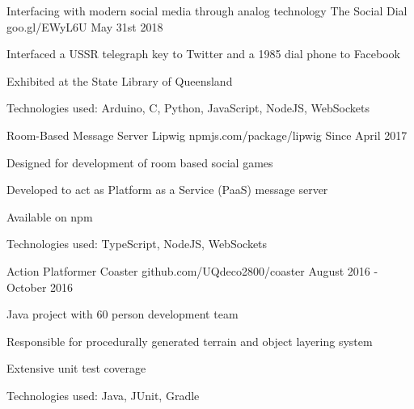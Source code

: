 


\begin{cventries}

\cventry
{Interfacing with modern social media through analog technology} %
{The Social Dial} %
{goo.gl/EWyL6U} %
{May 31st 2018} %
{ %
\begin{cvitems}
\item Interfaced a USSR telegraph key to Twitter and a 1985 dial phone to Facebook
\item Exhibited at the State Library of Queensland
\item Technologies used: Arduino, C, Python, JavaScript, NodeJS, WebSockets
\end{cvitems}
}

\cventry
{Room-Based Message Server} %
{Lipwig} %
{npmjs.com/package/lipwig} %
{Since April 2017} %
{ %
\begin{cvitems}
\item Designed for development of room based social games
\item Developed to act as Platform as a Service (PaaS) message server
\item Available on npm
\item Technologies used: TypeScript, NodeJS, WebSockets
\end{cvitems}
}


\cventry
{Action Platformer} %
{Coaster} %
{github.com/UQdeco2800/coaster} %
{August 2016 - October 2016} %
{ %
\begin{cvitems}
\item Java project with 60 person development team
\item Responsible for procedurally generated terrain and object layering system
\item Extensive unit test coverage
\item Technologies used: Java, JUnit, Gradle
\end{cvitems}
}


\end{cventries}
